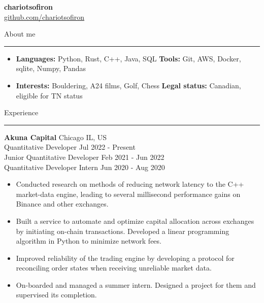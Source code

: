 \documentclass[12pt]{article}
\newcommand{\rSection}[1]{
    \medskip
    {\Large #1}
    \medskip
    \hrule
}
\begin{document}
\begin{center} 
    \textbf{\Huge chariotsofiron} \\
    \vspace{5pt}
    \href{https://www.github.com/chariotsofiron}{github.com/chariotsofiron}
\end{center}
\vspace{-15pt}


\rSection{About me}
\begin{itemize}[label={},leftmargin=0pt]
    \item{
        \textbf{Languages:} Python, Rust, C++, Java, SQL
        \hfill
        \textbf{Tools:} Git, AWS, Docker, sqlite, Numpy, Pandas
        \vspace{-5pt}
    }
    \item{
        \textbf{Interests:} Bouldering, A24 films, Golf, Chess
        \hfill
        \textbf{Legal status:} Canadian, eligible for TN status
        \vspace{-5pt}
    }
\end{itemize}


\rSection{Experience}

\textbf{Akuna Capital} \hfill Chicago IL, US\\
Quantitative Developer \hfill Jul 2022 - Present\\
Junior Quantitative Developer \hfill Feb 2021 - Jun 2022\\
Quantitative Developer Intern \hfill Jun 2020 - Aug 2020\\
\vspace{-18pt}
\begin{itemize}[leftmargin=13pt]
    \item Conducted research on methods of reducing network latency to the C++ market-data engine, leading to several millisecond performance gains on Binance and other exchanges.
    \vspace{-5pt}
    \item Built a service to automate and optimize capital allocation across exchanges by initiating on-chain transactions. Developed a linear programming algorithm in Python to minimize network fees.
    \vspace{-5pt}
    \item Improved reliability of the trading engine by developing a protocol for reconciling order states when receiving unreliable market data.
    \vspace{-5pt}
    \item On-boarded and managed a summer intern. Designed a project for them and supervised its completion.
\end{itemize}
\end{document}
